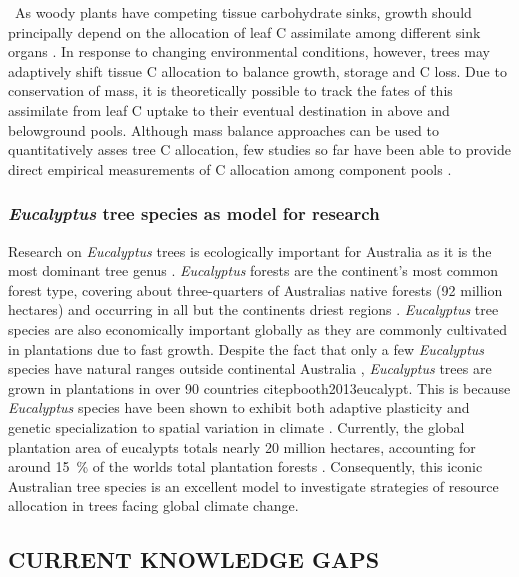 \documentclass[a4paper]{article}\usepackage[]{graphicx}\usepackage[]{color}
\begin{document}
\
As woody plants have competing tissue carbohydrate sinks, growth should principally depend on the allocation of leaf C assimilate among different sink organs \citep{kozlowski1992carbohydrate, lacointe2000carbon}. In response to changing environmental conditions, however, trees may adaptively shift tissue C allocation to balance growth, storage and C loss. Due to conservation of mass, it is theoretically possible to track the fates of this assimilate from leaf C uptake to their eventual destination in above and belowground pools. Although mass balance approaches can be used to quantitatively asses tree C allocation, few studies so far have been able to provide direct empirical measurements of C allocation among component pools \citep{klein2015}.

\subsubsection*{\textit{Eucalyptus} tree species as model for research}
Research on \textit{Eucalyptus} trees is ecologically important for Australia as it is the most dominant tree genus \citep{boland2006forest}. \textit{Eucalyptus} forests are the continent’s most common forest type, covering about three-quarters of Australia\textquotesingle s native forests (92 million hectares) and occurring in all but the continent\textquotesingle s driest regions \citep{ASOFR2013}. \textit{Eucalyptus} tree species are also economically important globally as they are commonly cultivated in plantations due to fast growth. Despite the fact that only a few \textit{Eucalyptus} species have natural ranges outside continental Australia \citep{pryor1981eucalyptus}, \textit{Eucalyptus} trees are grown in plantations in over 90 countries citep{booth2013eucalypt}. This is because \textit{Eucalyptus} species have been shown to exhibit both adaptive plasticity and genetic specialization to spatial variation in climate \citep{byrne2013adaptation}. Currently, the global plantation area of eucalypts totals nearly 20 million hectares, accounting for around 15~\% of the world\textquotesingle s total plantation forests \citep{IUFRO2015}. Consequently, this iconic Australian tree species is an excellent model to investigate strategies of resource allocation in trees facing global climate change.

\subsection*{CURRENT KNOWLEDGE GAPS}
\end{document}

